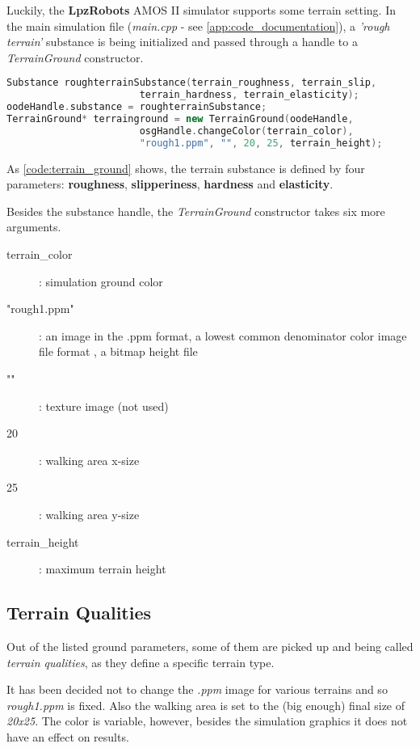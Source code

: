 Luckily, the \textbf{LpzRobots} AMOS II simulator supports some terrain setting. In the main simulation file (\textit{main.cpp} - see \ref{app:code_documentation}), a \textit{'rough terrain'} substance is being initialized and passed through a handle to a \textit{TerrainGround} constructor.

\begin{lstlisting}[language=C++, caption={Setting a terrain ground in main.cpp}, label=code:terrain_ground]
Substance roughterrainSubstance(terrain_roughness, terrain_slip,
                       terrain_hardness, terrain_elasticity);
oodeHandle.substance = roughterrainSubstance;
TerrainGround* terrainground = new TerrainGround(oodeHandle, 
                       osgHandle.changeColor(terrain_color),
                       "rough1.ppm", "", 20, 25, terrain_height);
\end{lstlisting}

As \cref{code:terrain_ground} shows, the terrain substance is defined by four parameters: \textbf{roughness}, \textbf{slipperiness}, \textbf{hardness} and \textbf{elasticity}.

Besides the substance handle, the \textit{TerrainGround} constructor takes six more arguments.

\begin{description}
\item[terrain\_color] : simulation ground color
\item["rough1.ppm"] : an image in the .ppm format, a lowest common denominator color image file format \citep{misc:ppm}, a bitmap height file
\item[""] : texture image (not used)
\item[20] : walking area x-size 
\item[25] : walking area y-size
\item[terrain\_height] : maximum terrain height
\end{description}

\subsection{Terrain Qualities} \label{ssec:terrain_qualities}
Out of the listed ground parameters, some of them are picked up and being called \textit{terrain qualities}, as they define a specific terrain type.

It has been decided not to change the \textit{.ppm} image for various terrains and so \textit{rough1.ppm} is fixed. Also the walking area is set to the (big enough) final size of \textit{20x25}. The color is variable, however, besides the simulation graphics it does not have an effect on results. 

